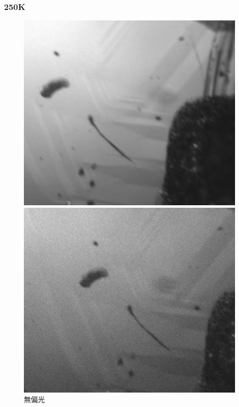 \documentclass[11pt,a4paper]{jsarticle}
\begin{document}
\subsubsection{250K}
\begin{figure}[htbp]
 \begin{minipage}{0.333\hsize}
  \begin{center}
   \includegraphics[width=\hsize]{nonpol250.eps}
  \end{center}
  \caption{無偏光}
  \label{fig:nonpol250}
 \end{minipage}
 \begin{minipage}{0.333\hsize}
  \begin{center}
   \includegraphics[width=\hsize]{hh250.eps}

\end{center}
\end{minipage}
\end{figure}
\end{document}
